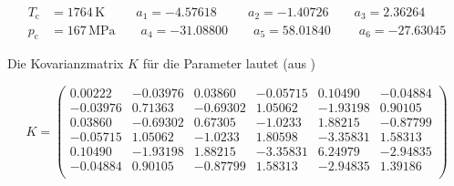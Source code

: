 \begin{equation}
\label{eq:params}
\begin{split}
T_{\text{c}} &= 1764\,\text{K} \ \: \qquad a_1=-4.57618  \ \: \qquad a_2=-1.40726        \qquad a_3=2.36264\\
p_{\text{c}} &= 167\,\text{MPa}     \qquad a_4=-31.08800      \qquad a_5=58.01840  \  \qquad a_6=-27.63045
\end{split}
\end{equation}

Die Kovarianzmatrix $K$ für die Parameter lautet (aus \cite{manual})

\begin{equation}
\label{eq:cov}
K=
\left(
\begin{array}{cccccc}
 0.00222 & -0.03976 & 0.03860 & -0.05715 & 0.10490 & -0.04884 \\
 -0.03976 & 0.71363 & -0.69302 & 1.05062 & -1.93198 & 0.90105 \\
 0.03860 & -0.69302 & 0.67305 & -1.0233 & 1.88215 & -0.87799 \\
 -0.05715 & 1.05062 & -1.0233 & 1.80598 & -3.35831 & 1.58313 \\
 0.10490 & -1.93198 & 1.88215 & -3.35831 & 6.24979 & -2.94835 \\
 -0.04884 & 0.90105 & -0.87799 & 1.58313 & -2.94835 & 1.39186 \\
\end{array}
\right)
\end{equation}